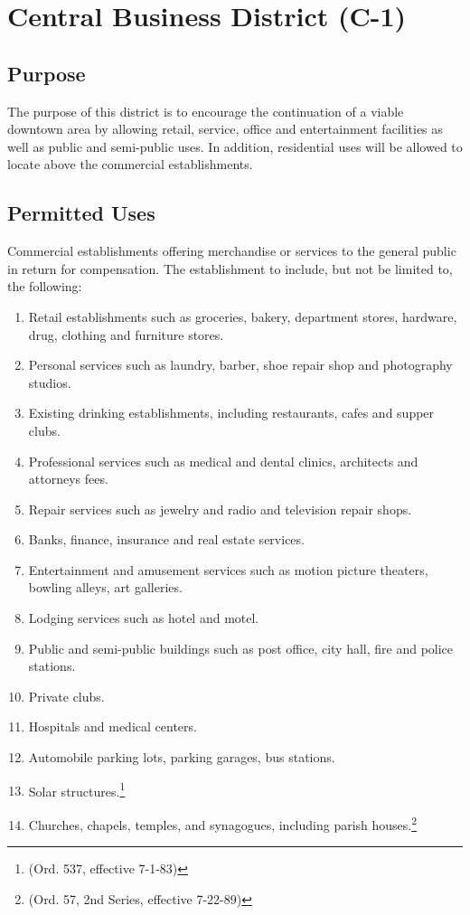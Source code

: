 
\setcounter{section}{49}
\section{Central Business District (C-1)}
\subsection{Purpose}
The purpose of this district is to encourage the continuation of a viable downtown area by allowing retail, service, office and entertainment facilities as well as public and semi-public uses.  In addition, residential uses will be allowed to locate above the commercial establishments.
\subsection{Permitted Uses}
Commercial establishments offering merchandise or services to the general public in return for compensation. The establishment to include, but not be limited to, the following:
\begin{enumerate}[{\indent}1)]
    \item Retail establishments such as groceries, bakery, department stores, hardware, drug, clothing and furniture stores.
    \item Personal services such as laundry, barber, shoe repair shop and photography studios.
    \item Existing drinking establishments, including restaurants, cafes and supper clubs.
    \item Professional services such as medical and dental clinics, architects and attorneys fees.
    \item Repair services such as jewelry and radio and television repair shops.
    \item Banks, finance, insurance and real estate services.
    \item Entertainment and amusement services such as motion picture theaters, bowling alleys, art galleries.
    \item Lodging services such as hotel and motel.
    \item Public and semi-public buildings such as post office, city hall, fire and police stations.
    \item Private clubs.
    \item Hospitals and medical centers.
    \item Automobile parking lots, parking garages, bus stations.
    \item Solar structures.\footnote{(Ord. 537, effective 7-1-83)}
    \item Churches, chapels, temples, and synagogues, including parish houses.\footnote{(Ord. 57, 2nd Series, effective 7-22-89)}
\end{enumerate}
